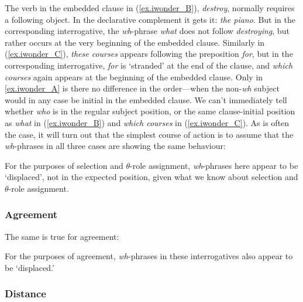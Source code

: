 \documentclass{article}
\begin{document}
The verb in the embedded clause in (\ref{ex.iwonder_B}),  \emph{destroy}, normally requires a following object.
In the declarative complement it gets it: \emph{the piano}.
But in the corresponding interrogative, the \emph{wh}-phrase \emph{what}  does not follow \emph{destroying}, but rather occurs at the very beginning of the embedded clause.
Similarly in (\ref{ex.iwonder_C}), \emph{these courses} appears following the preposition \emph{for}, but in the corresponding interrogative, \emph{for} is `stranded' at the end of the clause, and \emph{which courses} again appears at the beginning of the embedded clause.
Only in \ref{ex.iwonder_A} is there no difference in the order---when the non-\emph{wh} subject would in any case be initial in the embedded clause.
We can't immediately tell whether \emph{who} is in the regular subject position, or the same clause-initial position as \emph{what} in (\ref{ex.iwonder_B}) and \emph{which courses} in (\ref{ex.iwonder_C}).
As is often the case, it will turn out that the simplest course of action is to assume that the \emph{wh}-phrases in all three cases are showing the same behaviour:

For the purposes of selection and $\theta{}$-role assignment, \emph{wh}-phrases here appear to be `displaced', not in the expected position, given what we know about selection and $\theta{}$-role assignment.

\subsubsection{Agreement}

The same is true for agreement:
\begin{exe}
\end{exe}

For the purposes of agreement, \emph{wh}-phrases in these interrogatives also appear to be `displaced.'


\subsubsection{Distance}
\end{document}
